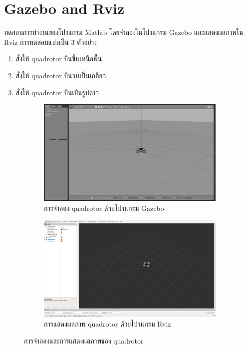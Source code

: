 \clearpage
\section{Gazebo and Rviz}
ทดสอบการทำงานของโปรแกรม Matlab โดยจำลองในโปรแกรม Gazebo และแสดงผลภาพใน Rviz
การทดสอบแบ่งเป็น 3 ตัวอย่าง
\begin{enumerate}[label=\arabic*), leftmargin=1.5cm]
	\setlength\itemsep{-0.25em}
	\item สั่งให้ quadrotor บินขึ้นเหนือพื้น
	\item สั่งให้ quadrotor บินวนเป็นเกลียว
	\item สั่งให้ quadrotor บินเป็นรูปดาว
\end{enumerate}

\begin{figure}[!ht]
    \centering
    \begin{subfigure}[b]{0.8\textwidth}
        \centering
        \includegraphics[width=\textwidth]{images/test/drone_gazebo.png}
        \caption{การจำลอง quadrotor ด้วยโปรแกรม Gazebo}
    \end{subfigure}
    \hfill
    \begin{subfigure}[b]{0.8\textwidth}
        \centering
        \includegraphics[width=\textwidth]{images/test/drone_rviz.png}
        \caption{การแสดงผลภาพ quadrotor ด้วยโปรแกรม Rviz}
    \end{subfigure}
    \caption{การจำลองและการแสดงผลภาพของ quadrotor }
\end{figure}

